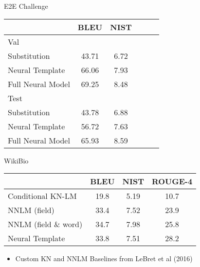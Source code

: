 \begin{frame}{E2E Challenge}
\begin{table}[t!]
\small
\centering
\begin{tabular}{@{}lccc@{\hspace{2.5mm}}c@{\hspace{2.5mm}}c@{}}
\toprule
 & BLEU & NIST \\
\midrule
Val & & &  \\
\midrule

Substitution  & 43.71 & 6.72 \\
Neural Template & 66.06 & 7.93 \\
Full Neural Model & 69.25 & 8.48 \\
\midrule
Test  & & \\
\midrule

Substitution & 43.78 & 6.88 \\
Neural Template    & 56.72 & 7.63 \\
Full Neural Model & 65.93 & 8.59 \\
\bottomrule
\end{tabular}
\label{tab:e2e}
\end{table}

\end{frame}


\begin{frame}{WikiBio}
\begin{table}[t!]
\small
\centering
\begin{tabular}{@{}lccc@{}}
\toprule
 & BLEU & NIST & ROUGE-4\\
\midrule
Conditional KN-LM  & 19.8 & 5.19 & 10.7 \\
NNLM (field)  & 33.4 & 7.52 & 23.9 \\
NNLM (field \& word)  & 34.7 & 7.98 & 25.8 \\
Neural Template &  33.8 & 7.51 & 28.2 \\
\bottomrule
\end{tabular}
\label{tab:wb}
\end{table}

\begin{itemize}
\item Custom KN and NNLM Baselines from LeBret et al (2016)
\end{itemize}

\end{frame}



